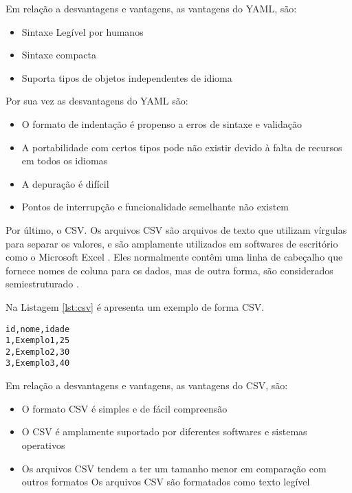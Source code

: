 Em relação a desvantagens e vantagens, as vantagens do YAML, são:
\begin{itemize}
    \item Sintaxe Legível por humanos
    \item Sintaxe compacta
    \item Suporta tipos de objetos independentes de idioma \cite{formatosDeDados}
\end{itemize}

Por sua vez as desvantagens do YAML são:
\begin{itemize}
    \item O formato de indentação é propenso a erros de sintaxe e validação
    \item A portabilidade com certos tipos pode não existir devido à falta de recursos em todos os idiomas
    \item A depuração é difícil
    \item Pontos de interrupção e funcionalidade semelhante não existem \cite{formatosDeDados}
\end{itemize}

Por último, o CSV. Os arquivos CSV são arquivos de texto que utilizam vírgulas para separar os valores, e são amplamente utilizados em softwares de escritório como o Microsoft Excel \cite{csvConteudo}. Eles normalmente contêm uma linha de cabeçalho que fornece nomes de coluna para os dados, mas de outra forma, são considerados semiestruturado \cite{csvDesvantagenseInfo}.

Na Listagem \ref{lst:csv} é apresenta um exemplo de forma CSV.

\begin{minipage}{0.9\linewidth}
\begin{lstlisting}[language=csv, caption=Exemplo do formato CSV., label=lst:csv]
id,nome,idade
1,Exemplo1,25
2,Exemplo2,30
3,Exemplo3,40
\end{lstlisting}
\end{minipage}

Em relação a desvantagens e vantagens, as vantagens do CSV, são:
\begin{itemize}
    \item O formato CSV é simples e de fácil compreensão
    \item O CSV é amplamente suportado por diferentes softwares e sistemas operativos
    \item Os arquivos CSV tendem a ter um tamanho menor em comparação com outros formatos Os arquivos CSV são formatados como texto legível \cite{csvVantagens}
\end{itemize}

